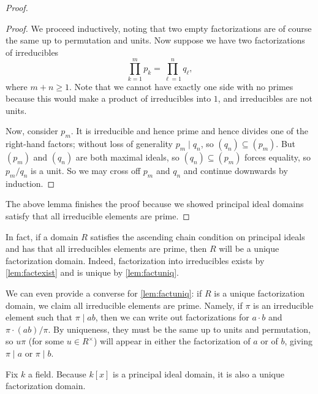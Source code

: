 \begin{proof}
\begin{proof}
		We proceed inductively, noting that two empty factorizations are of course the same up to permutation and units. Now suppose we have two factorizations of irreducibles
		\[\prod_{k=1}^mp_k=\prod_{\ell=1}^nq_\ell,\]
		where $m+n\ge1$. Note that we cannot have exactly one side with no primes because this would make a product of irreducibles into $1$, and irreducibles are not units.

		Now, consider $p_m$. It is irreducible and hence prime and hence divides one of the right-hand factors; without loss of generality $p_m\mid q_n$, so $(q_n)\subseteq(p_m)$. But $(p_m)$ and $(q_n)$ are both maximal ideals, so $(q_n)\subseteq(p_m)$ forces equality, so $p_m/q_n$ is a unit. So we may cross off $p_m$ and $q_n$ and continue downwards by induction.
	\end{proof}
	The above lemma finishes the proof because we showed principal ideal domains satisfy that all irreducible elements are prime.
\end{proof}
\begin{remark}[Nir] \label{rem:betterufd}
	In fact, if a domain $R$ satisfies the ascending chain condition on principal ideals and has that all irreducibles elements are prime, then $R$ will be a unique factorization domain. Indeed, factorization into irreducibles exists by \autoref{lem:factexist} and is unique by \autoref{lem:factuniq}.
\end{remark}
\begin{remark}[Nir] \label{rem:ufdimpliesirredisprime}
	We can even provide a converse for \autoref{lem:factuniq}: if $R$ is a unique factorization domain, we claim all irreducible elements are prime. Namely, if $\pi$ is an irreducible element such that $\pi\mid ab$, then we can write out factorizations for $a\cdot b$ and $\pi\cdot(ab)/\pi$. By uniqueness, they must be the same up to units and permutation, so $u\pi$ (for some $u\in R^\times$) will appear in either the factorization of $a$ or of $b$, giving $\pi\mid a$ or $\pi\mid b$.
\end{remark}
\begin{example} \label{ex:fieldpolyufd}
	Fix $k$ a field. Because $k[x]$ is a principal ideal domain, it is also a unique factorization domain.
\end{example}

